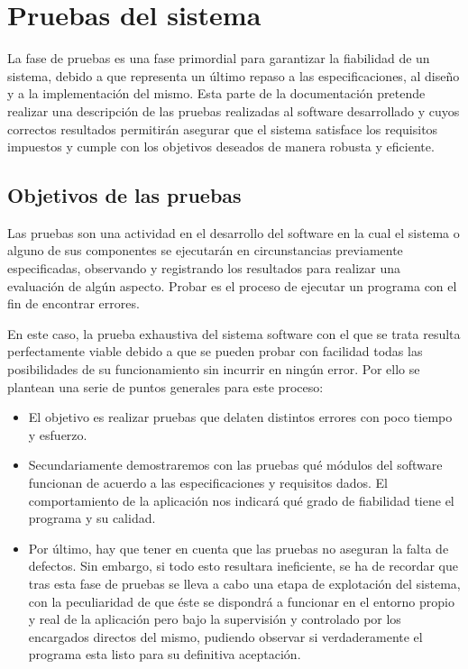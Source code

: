 \chapter[Pruebas del sistema]{Pruebas del sistema}

La fase de pruebas es una fase primordial para garantizar la fiabilidad de un sistema, debido a que representa un último repaso a las especificaciones, al diseño y a la implementación del mismo.
Esta parte de la documentación pretende realizar una descripción de las pruebas realizadas al software desarrollado y cuyos correctos resultados permitirán asegurar que el sistema satisface los requisitos impuestos y cumple con los objetivos deseados de manera robusta y eficiente.

\section{Objetivos de las pruebas}

Las pruebas son una actividad en el desarrollo del software en la cual el sistema o alguno de sus componentes se ejecutarán en circunstancias previamente especificadas, observando y registrando los resultados para realizar una evaluación de algún aspecto. Probar es el proceso de ejecutar un programa con el fin de encontrar errores.

En este caso, la prueba exhaustiva del sistema software con el que se trata resulta perfectamente viable debido a que se pueden probar con facilidad todas las posibilidades de su funcionamiento sin incurrir en ningún error. Por ello se plantean una serie de puntos generales para este proceso:

\begin{itemize}
	\item El objetivo es realizar pruebas que delaten distintos errores con poco tiempo y esfuerzo.
	\item Secundariamente demostraremos con las pruebas qué módulos del software funcionan de acuerdo a las especificaciones y requisitos dados. El comportamiento de la aplicación nos indicará qué grado de fiabilidad tiene el programa y su calidad.
	\item Por último, hay que tener en cuenta que las pruebas no aseguran la falta de defectos. Sin embargo, si todo esto resultara ineficiente, se ha de recordar que tras esta fase de pruebas se lleva a cabo una etapa de explotación del sistema, con la peculiaridad de que éste se dispondrá a funcionar en el entorno propio y real de la aplicación pero bajo la supervisión y controlado por los encargados directos del mismo, pudiendo observar si verdaderamente el programa esta listo para su definitiva aceptación.
\end{itemize}

